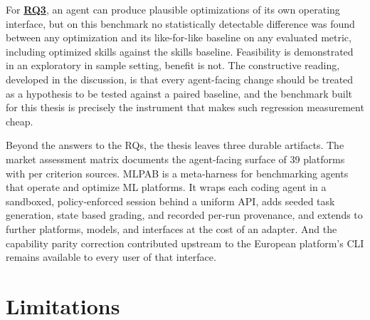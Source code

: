 \documentclass[
english,                 %
bibtex,                  %
]{kththesis}
\numberwithin{listing}{chapter}
\begin{document}
For \hyperref[rq3]{\textbf{RQ3}}, an agent can produce plausible optimizations of its own operating interface, but on this benchmark no statistically detectable difference was found between any optimization and its like-for-like baseline on any evaluated metric, including optimized skills against the skills baseline. Feasibility is demonstrated in an exploratory in sample setting, benefit is not. The constructive reading, developed in the discussion, is that every agent-facing change should be treated as a hypothesis to be tested against a paired baseline, and the benchmark built for this thesis is precisely the instrument that makes such regression measurement cheap.

Beyond the answers to the \glspl{RQ}, the thesis leaves three durable artifacts. The market assessment matrix documents the agent-facing surface of 39 platforms with per criterion sources. \gls{MLPAB} is a meta-harness for benchmarking agents that operate and optimize \gls{ML} platforms. It wraps each coding agent in a sandboxed, policy-enforced session behind a uniform \gls{API}, adds seeded task generation, state based grading, and recorded per-run provenance, and extends to further platforms, models, and interfaces at the cost of an adapter. And the capability parity correction contributed upstream to the European platform's \gls{CLI} remains available to every user of that interface.

\section{Limitations}
\label{sec:concl_limitations}
\glsresetall
\end{document}
